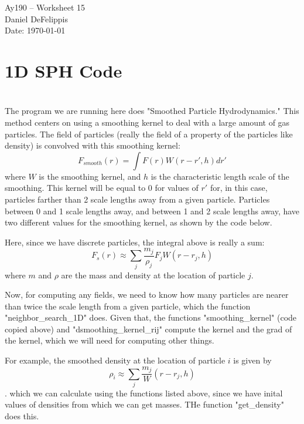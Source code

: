 \documentclass[11pt,letterpaper]{article}
\begin{document}
\begin{center}
\Large
Ay190 -- Worksheet 15\\
Daniel DeFelippis\\
Date: \today
\end{center}


\section*{1D SPH Code}

\section{}

The program we are running here does "Smoothed Particle Hydrodynamics." This method
centers on using a smoothing kernel to deal with a large amount of gas particles.
The field of particles (really the field of a property of the particles like density)
is convolved with this smoothing kernel:
$$ F_{smooth}(r) = \int F(r) W(r-r',h)dr' $$ 
where $W$ is the smoothing kernel, and $h$ is the characteristic length scale of the 
smoothing. This kernel will be equal to 0 for values of $r'$ for, in this case, 
particles farther than 2 scale lengths away from a given particle. Particles between
0 and 1 scale lengths away, and between 1 and 2 scale lengths away, have two different values
for the smoothing kernel, as shown by the code below.


Here, since we have discrete particles, the integral above is really a sum:
$$ F_s(r) \approx \sum\limits_j \frac{m_j}{\rho_j}F_j W(r-r_j,h) $$
where $m$ and $\rho$ are the mass and density at the location of particle $j$. 

Now, for computing any fields, we need to know how many particles are nearer than twice
the scale length from a given particle, which the function "neighbor\_search\_1D" does.
Given that, the functions "smoothing\_kernel" (code copied above) and
"dsmoothing\_kernel\_rij" compute the kernel and the grad of the kernel, which we
will need for computing other things. 

For example, the smoothed density at the location of particle $i$ is given by 
$$\rho_i \approx \sum\limits_j \frac{m_j}W(r-r_j,h)$$.
which we can calculate using the functions listed above, since we have inital values
of densities from which we can get masses. THe function "get\_density" does this.
\end{document}
